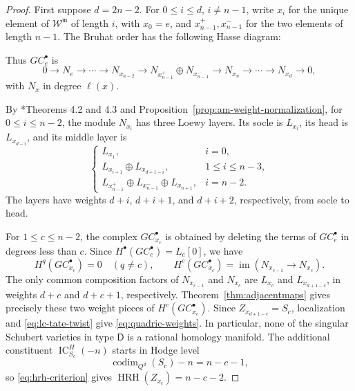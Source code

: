 \documentclass[12pt]{amsart}
\theoremstyle{definition}
\numberwithin{equation}{section}
\newcommand{\m}{\mathfrak m}
\newcommand{\W}{\mathscr W}
\begin{document}
\begin{proof}
First suppose $d=2n-2$. For $0\leq i\leq d$, $i\ne n-1$,
write $x_i$ for the unique element of $\W^{\m}$ of length
$i$, with $x_0=e$, and
$x_{n-1}^{+},x_{n-1}^{-}$ for the two elements of length
$n-1$. The Bruhat order has the following Hasse diagram:
\begin{center}
\end{center}
Thus $GC_e^{\bullet}$ is
\[
0\longrightarrow N_e\longrightarrow\cdots
\longrightarrow N_{x_{n-2}}
\longrightarrow
N_{x_{n-1}^{+}}\oplus N_{x_{n-1}^{-}}
\longrightarrow N_{x_n}\longrightarrow\cdots
\longrightarrow N_{x_d}\longrightarrow0,
\]
with $N_x$ in degree $\ell(x)$.

By \cite{brenti}*{Theorems 4.2 and 4.3} and
Proposition~\ref{prop:am-weight-normalization}, for
$0\leq i\leq n-2$, the module $N_{x_i}$ has three Loewy
layers. Its socle is $L_{x_i}$, its head is $L_{x_{d-i}}$,
and its middle layer is
\[
\begin{cases}
L_{x_1},&i=0,\\
L_{x_{i+1}}\oplus L_{x_{d+1-i}},&1\leq i\leq n-3,\\
L_{x_{n-1}^{+}}\oplus L_{x_{n-1}^{-}}\oplus L_{x_{n+1}},
   &i=n-2.
\end{cases}
\]
The layers have weights $d+i$, $d+i+1$, and $d+i+2$,
respectively, from socle to head.

For $1\leq c\leq n-2$, the complex $GC_{x_c}^{\bullet}$
is obtained by deleting the terms of $GC_e^{\bullet}$
in degrees less than $c$. Since
$H^{\bullet}(GC_e^{\bullet})=L_e[0]$, we have
\[
H^q(GC_{x_c}^{\bullet})=0\quad(q\ne c),\qquad
H^c(GC_{x_c}^{\bullet})
=\operatorname{im}\!\left(
N_{x_{c-1}}\longrightarrow N_{x_c}
\right).
\]
The only common composition factors of $N_{x_{c-1}}$
and $N_{x_c}$ are $L_{x_c}$ and $L_{x_{d+1-c}}$,
in weights $d+c$ and $d+c+1$, respectively.
Theorem~\ref{thm:adjacentmaps} gives precisely
these two weight pieces of $H^c(GC_{x_c}^{\bullet})$.
Since $Z_{x_{d+1-c}}=S_c$, localization and
\eqref{eq:lc-tate-twist} give
\eqref{eq:quadric-weights}. In particular, none of the
singular Schubert varieties in type $\mathsf D$ is a
rational homology manifold.
The additional constituent $\operatorname{IC}_{S_c}^H(-n)$
starts in Hodge level
\[
\operatorname{codim}_{Q^d}(S_c)-n=n-c-1,
\]
so \eqref{eq:hrh-criterion} gives
$\operatorname{HRH}(Z_{x_c})=n-c-2$.


\end{proof}
\end{document}
